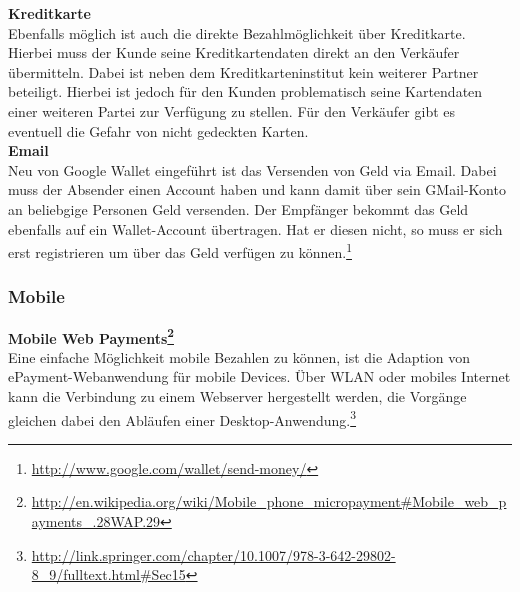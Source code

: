 \textbf{Kreditkarte}\\
Ebenfalls möglich ist auch die direkte Bezahlmöglichkeit über Kreditkarte. Hierbei muss der Kunde seine Kreditkartendaten direkt an den Verkäufer übermitteln. Dabei ist neben dem Kreditkarteninstitut kein weiterer Partner beteiligt. Hierbei ist jedoch für den Kunden problematisch seine Kartendaten einer weiteren Partei zur Verfügung zu stellen. Für den Verkäufer gibt es eventuell die Gefahr von nicht gedeckten Karten.\\

\textbf{Email}\\
Neu von Google Wallet eingeführt ist das Versenden von Geld via Email. Dabei muss der Absender einen Account haben und kann damit über sein GMail-Konto an beliebgige Personen Geld versenden. Der Empfänger bekommt das Geld ebenfalls auf ein Wallet-Account übertragen. Hat er diesen nicht, so muss er sich erst registrieren um über das Geld verfügen zu können.\footnote{\url{http://www.google.com/wallet/send-money/}}\\

\subsubsection{Mobile}
\textbf{Mobile Web Payments\footnote{\url{http://en.wikipedia.org/wiki/Mobile_phone_micropayment\#Mobile_web_payments_.28WAP.29}}}\\
Eine einfache Möglichkeit mobile Bezahlen zu können, ist die Adaption von ePayment-Webanwendung für mobile Devices. Über WLAN oder mobiles Internet kann die Verbindung zu einem Webserver hergestellt werden, die Vorgänge gleichen dabei den Abläufen einer Desktop-Anwendung.\footnote{\url{http://link.springer.com/chapter/10.1007/978-3-642-29802-8_9/fulltext.html\#Sec15}}\\

